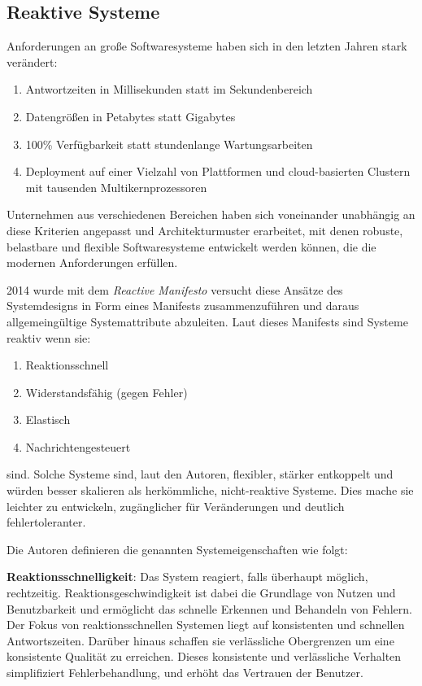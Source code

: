 \subsection{Reaktive Systeme}
\label{section:reaktive_systeme}
Anforderungen an große Softwaresysteme haben sich in den letzten Jahren stark verändert:
\begin{enumerate}
	\item Antwortzeiten in Millisekunden statt im Sekundenbereich
	\item Datengrößen in Petabytes statt Gigabytes
	\item 100\% Verfügbarkeit statt stundenlange Wartungsarbeiten
	\item Deployment auf einer Vielzahl von Plattformen und cloud-basierten Clustern mit tausenden Multikernprozessoren
\end{enumerate}

Unternehmen aus verschiedenen Bereichen haben sich voneinander unabhängig an diese Kriterien angepasst und Architekturmuster
erarbeitet, mit denen robuste, belastbare und flexible Softwaresysteme entwickelt werden können, die die modernen Anforderungen
erfüllen.

2014 wurde mit dem \textit{Reactive Manifesto} versucht diese Ansätze des Systemdesigns in Form eines Manifests zusammenzuführen
und daraus allgemeingültige Systemattribute abzuleiten.
Laut dieses Manifests sind Systeme reaktiv wenn sie:
\begin{enumerate}
	\item Reaktionsschnell
	\item Widerstandsfähig (gegen Fehler)
	\item Elastisch
	\item Nachrichtengesteuert
\end{enumerate}
sind.
Solche Systeme sind, laut den Autoren, flexibler, stärker entkoppelt und würden besser skalieren als herkömmliche, nicht-reaktive Systeme.
Dies mache sie leichter zu entwickeln, zugänglicher für Veränderungen und deutlich fehlertoleranter.

Die Autoren definieren die genannten Systemeigenschaften wie folgt:

\textbf{Reaktionsschnelligkeit}: Das System reagiert, falls überhaupt möglich, rechtzeitig. Reaktionsgeschwindigkeit ist dabei die Grundlage von Nutzen und
Benutzbarkeit und ermöglicht das schnelle Erkennen und Behandeln von Fehlern.
Der Fokus von reaktionsschnellen Systemen liegt auf konsistenten und schnellen Antwortszeiten. Darüber hinaus schaffen sie
verlässliche Obergrenzen um eine konsistente Qualität zu erreichen.
Dieses konsistente und verlässliche Verhalten simplifiziert Fehlerbehandlung, und erhöht das Vertrauen der Benutzer.


